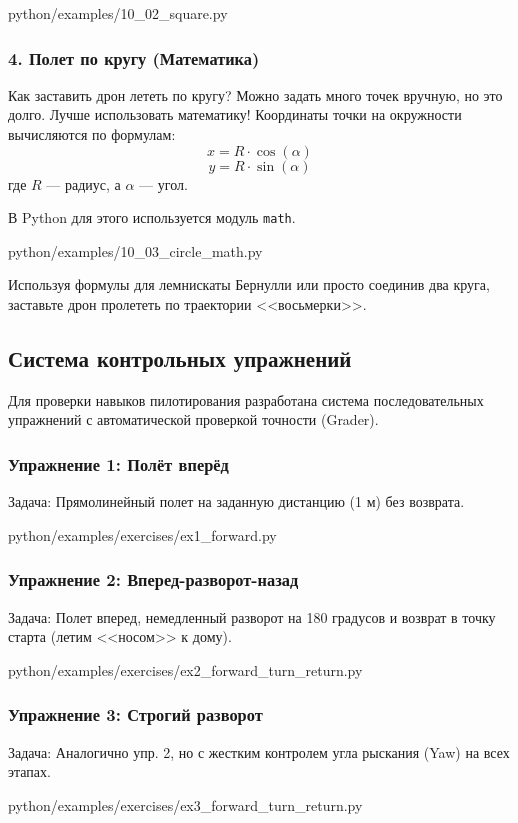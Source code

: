 \begin{codefile}[python]{python/examples/10_02_square.py}
\end{codefile}

\subsubsection*{4. Полет по кругу (Математика)}
Как заставить дрон лететь по кругу? Можно задать много точек вручную, но это долго. Лучше использовать математику!
Координаты точки на окружности вычисляются по формулам:
\[ x = R \cdot \cos(\alpha) \]
\[ y = R \cdot \sin(\alpha) \]
где $R$ — радиус, а $\alpha$ — угол.

В Python для этого используется модуль \texttt{math}.

\begin{codefile}[python]{python/examples/10_03_circle_math.py}
\end{codefile}

\begin{taskbox}[Восьмерка]
Используя формулы для лемнискаты Бернулли или просто соединив два круга, заставьте дрон пролететь по траектории <<восьмерки>>.
\end{taskbox}

\newpage
\subsection{Система контрольных упражнений}
Для проверки навыков пилотирования разработана система последовательных упражнений с автоматической проверкой точности (Grader).

\subsubsection*{Упражнение 1: Полёт вперёд}
Задача: Прямолинейный полет на заданную дистанцию (1 м) без возврата.
\begin{codefile}[python]{python/examples/exercises/ex1_forward.py}
\end{codefile}

\subsubsection*{Упражнение 2: Вперед-разворот-назад}
Задача: Полет вперед, немедленный разворот на 180 градусов и возврат в точку старта (летим <<носом>> к дому).
\begin{codefile}[python]{python/examples/exercises/ex2_forward_turn_return.py}
\end{codefile}

\subsubsection*{Упражнение 3: Строгий разворот}
Задача: Аналогично упр. 2, но с жестким контролем угла рыскания (Yaw) на всех этапах.
\begin{codefile}[python]{python/examples/exercises/ex3_forward_turn_return.py}
\end{codefile}

